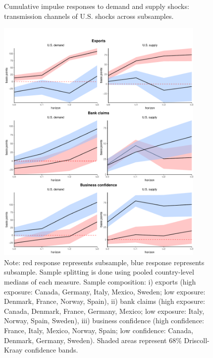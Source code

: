 \documentclass[12pt, a4paper]{article}
\begin{document}
\begin{figure}[H]
    \centering    
    \caption{Cumulative impulse responses to demand and supply shocks: transmission channels of U.S. shocks across subsamples.}    
    \label{fig:demand_supply_channels}
    \includegraphics[width=0.90\textwidth]{Figures/high_low_LP_channels_US.pdf}
   \centering \caption*{Note: red response represents  subsample, blue response represents  subsample. Sample splitting is done using pooled country-level medians of each measure. Sample composition: i) exports (high exposure: Canada, Germany, Italy, Mexico, Sweden; low exposure: Denmark, France, Norway, Spain), ii) bank claims (high exposure: Canada, Denmark, France, Germany, Mexico; low exposure: Italy, Norway, Spain, Sweden), iii) business confidence (high confidence: France, Italy, Mexico, Norway, Spain; low confidence: Canada, Denmark, Germany, Sweden). Shaded areas represent 68\% Driscoll-Kraay confidence bands.}
\end{figure}

\end{document}
